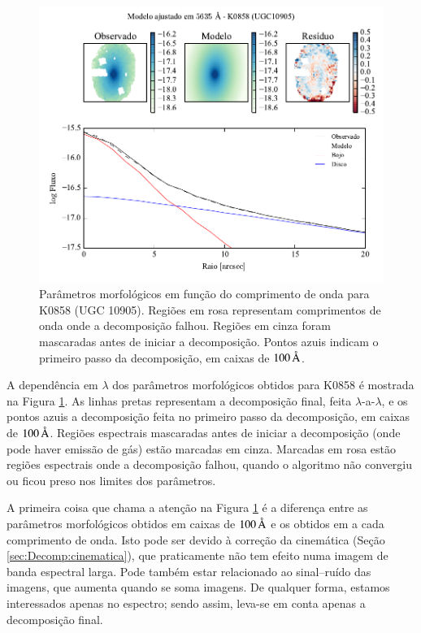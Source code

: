 \begin{figure}
	\includegraphics[page=2]{figuras-decomp/K0858_sample006a}
	\caption[Parâmetros morfológicos em função do comprimento de onda para K0858
	(UGC 10905)]
	{Parâmetros morfológicos em função do comprimento de onda para
	K0858 (UGC 10905). Regiões em rosa representam comprimentos de onda onde a
	decomposição falhou. Regiões em cinza foram mascaradas antes de iniciar a
	decomposição. Pontos azuis indicam o primeiro passo da decomposição, em caixas
	de $100\,\text{\normalfont\AA}$.}
	\label{fig:decompParams}
\end{figure}

A dependência em $\lambda$ dos parâmetros morfológicos obtidos para K0858 é
mostrada na Figura \ref{fig:decompParams}. As linhas pretas representam a
decomposição final, feita $\lambda$-a-$\lambda$, e os pontos azuis a
decomposição feita no primeiro passo da decomposição, em caixas de
$100\,\text{\normalfont\AA}$. Regiões espectrais mascaradas antes de iniciar a decomposição
(onde pode haver emissão de gás) estão marcadas em cinza. Marcadas em rosa estão
regiões espectrais onde a decomposição falhou, quando o algoritmo não convergiu
ou ficou preso nos limites dos parâmetros.

A primeira coisa que chama a atenção na Figura \ref{fig:decompParams} é a
diferença entre as parâmetros morfológicos obtidos em caixas de $100\,\text{\normalfont\AA}$
e os obtidos em a cada comprimento de onda. Isto pode ser devido à correção da
cinemática (Seção \ref{sec:Decomp:cinematica}), que praticamente não tem efeito
numa imagem de banda espectral larga. Pode também estar relacionado ao
sinal--ruído das imagens, que aumenta quando se soma imagens. De qualquer forma,
estamos interessados apenas no espectro; sendo assim, leva-se em conta apenas a
decomposição final.

